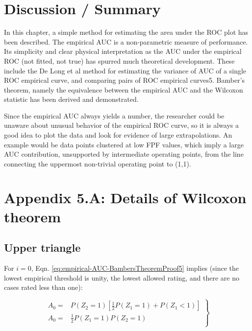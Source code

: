 \documentclass[
]{book}
\begin{document}
\hypertarget{discussion-summary}{%
\section{Discussion / Summary}\label{discussion-summary}}

In this chapter, a simple method for estimating the area under the ROC plot has been described. The empirical AUC is a non-parametric measure of performance. Its simplicity and clear physical interpretation as the AUC under the empirical ROC (not fitted, not true) has spurred much theoretical development. These include the De Long et al method for estimating the variance of AUC of a single ROC empirical curve, and comparing pairs of ROC empirical curves5. Bamber's theorem, namely the equivalence between the empirical AUC and the Wilcoxon statistic has been derived and demonstrated.

Since the empirical AUC always yields a number, the researcher could be unaware about unusual behavior of the empirical ROC curve, so it is always a good idea to plot the data and look for evidence of large extrapolations. An example would be data points clustered at low FPF values, which imply a large AUC contribution, unsupported by intermediate operating points, from the line connecting the uppermost non-trivial operating point to (1,1).

\hypertarget{appendix-5.a-details-of-wilcoxon-theorem}{%
\section{Appendix 5.A: Details of Wilcoxon theorem}\label{appendix-5.a-details-of-wilcoxon-theorem}}

\hypertarget{upper-triangle}{%
\subsection{Upper triangle}\label{upper-triangle}}

For \(i = 0\), Eqn. \eqref{eq:empirical-AUC-BambersTheoremProof5} implies (since the lowest empirical threshold is unity, the lowest allowed rating, and there are no cases rated less than one):

\begin{equation}
\left. 
\begin{aligned}
A_0 =& P\left ( Z_2 = 1 \right )\left [ \frac{1}{2} P\left ( Z_1=1 \right ) + P\left ( Z_1<1 \right )\right ] \\
A_0 =& \frac{1}{2} P\left ( Z_1=1 \right ) P\left ( Z_2=1 \right )\\
\end{aligned}
\right \}
\end{equation}
\end{document}
